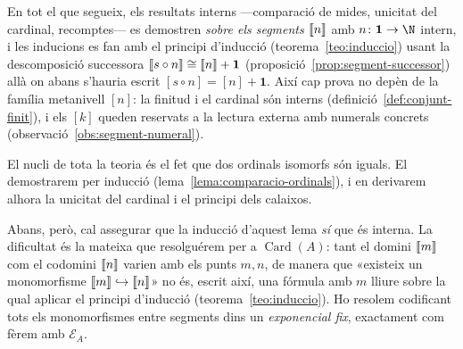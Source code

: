 \begin{observacio}\label{obs:seg-vs-corxet}
En tot el que segueix, els resultats interns ---comparació de mides,
unicitat del cardinal, recomptes--- es demostren \emph{sobre els segments
\(\llbracket n\rrbracket\)} amb \(n\colon\mathbf1\to\N\) intern, i les inducions es fan
amb el principi d'inducció (teorema~\ref{teo:induccio}) usant la
descomposició successora \(\llbracket s\circ n\rrbracket\cong\llbracket n\rrbracket+\mathbf1\)
(proposició~\ref{prop:segment-successor}) allà on abans s'hauria escrit
\([s\circ n]=[n]+\mathbf1\). Així cap prova no depèn de la família
metanivell \([n]\): la finitud i el cardinal són interns
(definició~\ref{def:conjunt-finit}), i els \([k]\) queden reservats a la
lectura externa amb numerals concrets (observació~\ref{obs:segment-numeral}).
\end{observacio}

El nucli de tota la teoria és el fet que dos ordinals isomorfs són iguals.
El demostrarem per inducció (lema~\ref{lema:comparacio-ordinals}), i en derivarem alhora la unicitat del
cardinal i el principi dels calaixos.

Abans, però, cal assegurar que la inducció d'aquest lema \emph{sí} que és
interna. La dificultat és la mateixa que resolguérem per a
\(\operatorname{Card}(A)\): tant el domini \(\llbracket m\rrbracket\) com el codomini
\(\llbracket n\rrbracket\) varien amb els punts \(m,n\), de manera que «existeix un
monomorfisme \(\llbracket m\rrbracket\hookrightarrow\llbracket n\rrbracket\)» no és, escrit així, una
fórmula amb \(m\) lliure sobre la qual aplicar el principi d'inducció
(teorema~\ref{teo:induccio}). Ho resolem codificant tots els monomorfismes
entre segments dins un \emph{exponencial fix}, exactament com fèrem amb
\(\mathcal E_A\).

